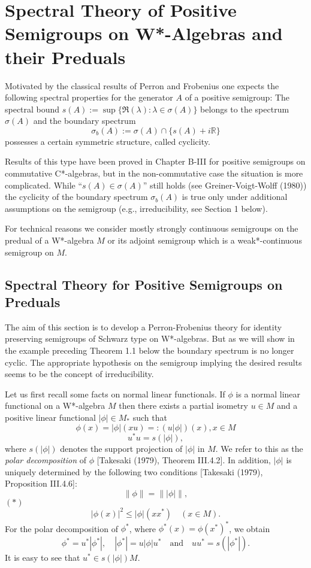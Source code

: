 
\chapter{Spectral Theory of Positive Semigroups on W*-Algebras and their Preduals}\label{chap:D-III}

Motivated by the classical results of Perron and Frobenius one expects the following spectral properties for the generator $A$ of a positive semigroup: The spectral bound $s(A) := \sup\{\Re(\lambda) : \lambda \in \sigma(A)\}$ belongs to the spectrum $\sigma(A)$ and the boundary spectrum
\[
\sigma_{b}(A) := \sigma(A) \cap \{s(A)+i\mathbb{R}\}
\]
possesses a certain symmetric structure, called cyclicity.

Results of this type have been proved in Chapter B-III for positive semigroups on commutative C*-algebras, but in the non-commutative case the situation is more complicated.
While \enquote{$s(A) \in \sigma(A)$} still holds (see Greiner-Voigt-Wolff (1980)) the cyclicity of the boundary spectrum $\sigma_{b}(A)$ is true only under additional assumptions on the semigroup (e.g., irreducibility, see Section 1 below).

For technical reasons we consider mostly strongly continuous semigroups on the predual of a W*-algebra $M$ or its adjoint semigroup which is a weak*-continuous semigroup on $M$.

\section{Spectral Theory for Positive Semigroups on Preduals}

The aim of this section is to develop a Perron-Frobenius theory for identity preserving semigroups of Schwarz type on W*-algebras.
But as we will show in the example preceding Theorem 1.1 below the boundary spectrum is no longer cyclic.
The appropriate hypothesis on the semigroup implying the desired results seems to be the concept of irreducibility.

Let us first recall some facts on normal linear functionals.
If $\phi$ is a normal linear functional on a W*-algebra $M$ then there exists a partial isometry $u\in M$ and a positive linear functional $|\phi|\in M_{*}$ such that
\[
\phi(x) = |\phi|(xu) =: (u|\phi|)(x), x\in M
\]
\[
u^*u = s(|\phi|),
\]
where $s(|\phi|)$ denotes the support projection of $|\phi|$ in $M$.
We refer to this as the \emph{polar decomposition} of $\phi$ [Takesaki (1979), Theorem III.4.2].
In addition, $|\phi|$ is uniquely determined by the following two conditions [Takesaki (1979), Proposition III.4.6]:
\[
	\|\phi\| = \| |\phi| \|,
\]
$(*)$ 
\[
	|\phi(x)|^{2} \leq |\phi|(xx^*) \quad (x\in M).
\]
For the polar decomposition of $\phi^*$, where $\phi^*(x) = \phi(x^*)^*$, we obtain
\[
	\phi^* = u^*|\phi^*|, \quad |\phi^*| = u|\phi|u^* \quad \text{and} \quad 		uu^* = s(|\phi^*|).
\]
It is easy to see that $u^*\in s(|\phi|)M$.

